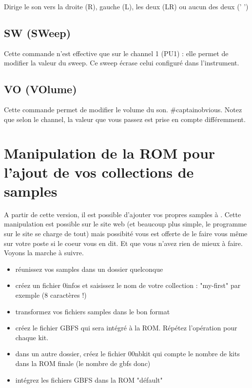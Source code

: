 \documentclass[12pt,a4paper]{article}
\begin{document}
  Dirige le son vers la droite (R), gauche (L), les deux (LR) ou aucun des deux ('  ')

  \subsection{SW (SWeep)}

  Cette commande n'est effective que sur le channel 1 (PU1) : elle permet de modifier la valeur du sweep. Ce sweep écrase celui configuré dans l'instrument.

  \subsection{VO (VOlume)}

  Cette commande permet de modifier le volume du son. \#captainobvious. Notez que selon le channel, la valeur que vous passez est prise en compte différemment.

  \section{Manipulation de la ROM pour l'ajout de vos collections de samples}

  A partir de cette version, il est possible d'ajouter vos propres samples à \FAT. Cette manipulation est possible sur le site web (et beaucoup plus simple, le programme sur le site se charge de tout) mais possibité vous est offerte de le faire vous même sur votre poste si le coeur vous en dit. Et que vous n'avez rien de mieux à faire.
  Voyons la marche à suivre.\medskip

    \begin{itemize}
      \item{réunissez vos samples dans un dossier quelconque}
      \item{créez un fichier 0infos et saisissez le nom de votre collection : "my-first" par exemple (8 caractères !) }
      \item{transformez vos fichiers samples dans le bon format}
      \item{créez le fichier GBFS qui sera intégré à la ROM. Répétez l'opération pour chaque kit.}
      \item{dans un autre dossier, créez le fichier 00nbkit qui compte le nombre de kits dans la ROM finale (le nombre de gbfs donc)}
      \item{intégrez les fichiers GBFS dans la ROM "défault"}
    \end{itemize}\medskip
\end{document}
